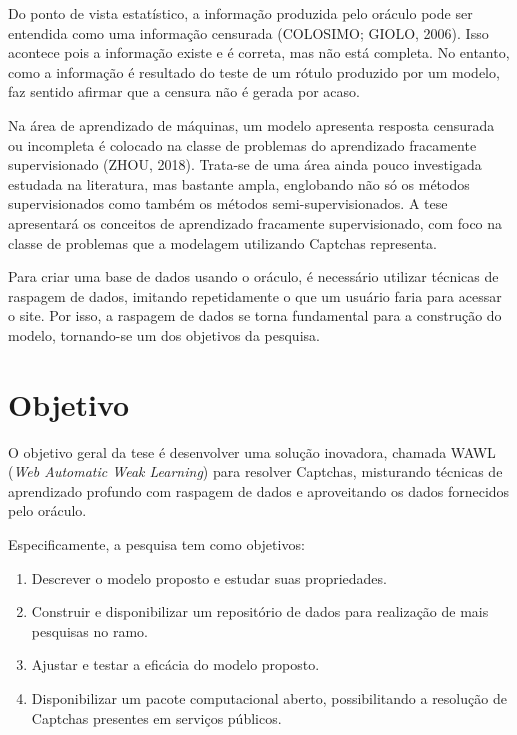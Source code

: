 \documentclass[12pt,twoside,brazilian]{book}
\providecommand{\tightlist}{%
  \setlength{\itemsep}{0pt}\setlength{\parskip}{0pt}}
\begin{document}
Do ponto de vista estatístico, a informação produzida pelo oráculo pode
ser entendida como uma informação censurada (COLOSIMO; GIOLO, 2006).
Isso acontece pois a informação existe e é correta, mas não está
completa. No entanto, como a informação é resultado do teste de um
rótulo produzido por um modelo, faz sentido afirmar que a censura não é
gerada por acaso.

Na área de aprendizado de máquinas, um modelo apresenta resposta
censurada ou incompleta é colocado na classe de problemas do aprendizado
fracamente supervisionado (ZHOU, 2018). Trata-se de uma área ainda pouco
investigada estudada na literatura, mas bastante ampla, englobando não
só os métodos supervisionados como também os métodos
semi-supervisionados. A tese apresentará os conceitos de aprendizado
fracamente supervisionado, com foco na classe de problemas que a
modelagem utilizando Captchas representa.

Para criar uma base de dados usando o oráculo, é necessário utilizar
técnicas de raspagem de dados, imitando repetidamente o que um usuário
faria para acessar o site. Por isso, a raspagem de dados se torna
fundamental para a construção do modelo, tornando-se um dos objetivos da
pesquisa.

\hypertarget{objetivos}{%
\section{Objetivo}\label{objetivos}}

O objetivo geral da tese é desenvolver uma solução inovadora, chamada
WAWL (\emph{Web Automatic Weak Learning}) para resolver Captchas,
misturando técnicas de aprendizado profundo com raspagem de dados e
aproveitando os dados fornecidos pelo oráculo.

Especificamente, a pesquisa tem como objetivos:

\begin{enumerate}
\def\labelenumi{\arabic{enumi}.}
\tightlist
\item
  Descrever o modelo proposto e estudar suas propriedades.
\item
  Construir e disponibilizar um repositório de dados para realização de
  mais pesquisas no ramo.
\item
  Ajustar e testar a eficácia do modelo proposto.
\item
  Disponibilizar um pacote computacional aberto, possibilitando a
  resolução de Captchas presentes em serviços públicos.
\end{enumerate}
\end{document}
